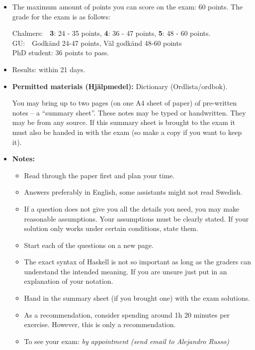 \documentclass[a4,11pt]{article}
\begin{document}
\begin{itemize}
\item The maximum amount of points you can score on the exam: 60 points.
The grade for the exam is as follows:

Chalmers:~~\textbf{3}: 24 - 35 points, \textbf{4}: 36 - 47 points,  \textbf{5}: 48 - 60 points. \\
GU:~~Godk\"and 24-47 points, V\"al godk\"and 48-60 points \\ PhD student: 36
points to pass.

\item Results: within 21 days.

\item \textbf{Permitted materials (Hj\"alpmedel):} Dictionary
  (Ordlista/ordbok).

  You may bring up to two pages (on one A4 sheet of paper) of pre-written notes
  -- a ``summary sheet''. These notes may be typed or handwritten. They may be
  from any source. If this summary sheet is brought to the exam it must also be
  handed in with the exam (so make a copy if you want to keep it).

\item \textbf{Notes:}
\begin{itemize}
\item Read through the paper first and plan your time.
\item Answers preferably in English, some assistants might not read Swedish.
\item If a question does not give you all the details you need, you may make
  reasonable assumptions.  Your assumptions must be clearly stated.  If your
  solution only works under certain conditions, state them.
\item
  Start each of the questions on a new page.

\item The exact syntax of Haskell is not so important as long as the graders can
  understand the intended meaning.  If you are unsure just put in an explanation
  of your notation.

\item Hand in the summary sheet (if you brought one) with the exam solutions.

\item As a recommendation, consider spending around 1h 20 minutes per
  exercise. However, this is only a recommendation.

\item To see your exam: \emph{by appointment (send email to Alejandro Russo)}
\end{itemize}

\end{itemize}
\vfill\hfill
\end{document}
